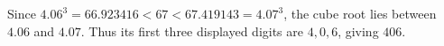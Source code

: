 Since $4.06^3=66.923416<67<67.419143=4.07^3$, the cube root lies between $4.06$ and $4.07$. Thus its first three displayed digits are $4,0,6$, giving $\boxed{406}$.
